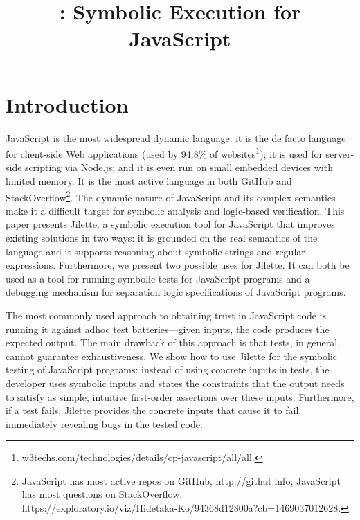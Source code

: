 \documentclass{llncs}
\title{\jilette: Symbolic Execution for JavaScript}
\author{}
\institute{Imperial College London}
\newcommand{\jilette}{Jilette\xspace}
\newcommand{\myparagraph}[1]{\smallskip\noindent {\bf #1.}\hspace{1pt}}
\begin{document}
%

\maketitle 

\begin{abstract}

\end{abstract}


\section{Introduction}

JavaScript is the most widespread dynamic language: it is the de facto language for client-side Web
applications (used by 94.8\% of websites\footnote{w3techs.com/technologies/details/cp-javascript/all/all.});
it is used for server-side scripting via Node.js; and it is even run on small embedded devices with limited 
memory. It is the most active language in both GitHub and StackOverflow\footnote{JavaScript  has most active
 repos on GitHub, http://githut.info; JavaScript has most questions on 
 StackOverflow, \\https://exploratory.io/viz/Hidetaka-Ko/94368d12800a?cb=1469037012628.}.
The dynamic nature of JavaScript and its complex semantics make it a difficult target for
symbolic analysis and logic-based verification. 
This paper presents \jilette, a symbolic execution tool for JavaScript that improves existing solutions
in two ways:  it is grounded on the real semantics of the language and 
 it supports reasoning about symbolic strings and regular expressions. 
%
Furthermore, we present two possible uses for \jilette. It can both be used as  a tool for
 running symbolic tests for JavaScript programs and  a debugging mechanism for separation 
 logic specifications of JavaScript programs. 

\myparagraph{Symbolic Testing} The most commonly used 
approach to obtaining trust in JavaScript code is running it against 
adhoc test batteries---given inputs, the code produces the expected
output. The main drawback of this approach is that tests, in general,
cannot guarantee exhaustiveness. We show how to use \jilette
for the symbolic testing of JavaScript programs: instead of using concrete 
inputs in tests, the developer uses symbolic inputs and states the 
constraints that the output needs to satisfy as simple, intuitive 
first-order assertions over these inputs. 
Furthermore, if a test fails, Jilette provides the concrete inputs that cause it 
to fail, immediately revealing bugs in the tested code.
\end{document}
